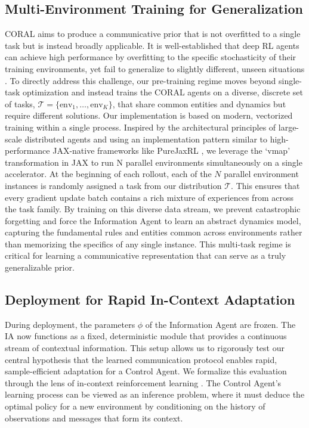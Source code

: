 \documentclass[letterpaper]{article}
\begin{document}
\subsection{Multi-Environment Training for Generalization}
CORAL aims to produce a communicative prior that is not overfitted to a single task but is instead broadly applicable. It is well-established that deep RL agents can achieve high performance by overfitting to the specific stochasticity of their training environments, yet fail to generalize to slightly different, unseen situations \cite{cobbe2020leveraging}.
To directly address this challenge, our pre-training regime moves beyond single-task optimization and instead trains the CORAL agents on a diverse, discrete set of tasks, $\mathcal{T} = \{\text{env}_1, \ldots, \text{env}_K\}$, that share common entities and dynamics but require different solutions. Our implementation is based on modern, vectorized training within a single process. Inspired by the architectural principles of large-scale distributed agents \cite{espeholt2018impala} and using an implementation pattern similar to high-performance JAX-native frameworks like PureJaxRL \cite{lu2022discovered}, we leverage the `vmap' transformation in JAX \cite{jax2018github} to run N parallel environments simultaneously on a single accelerator.
At the beginning of each rollout, each of the $N$ parallel environment instances is randomly assigned a task from our distribution $\mathcal{T}$. This ensures that every gradient update batch contains a rich mixture of experiences from across the task family. By training on this diverse data stream, we prevent catastrophic forgetting and force the Information Agent to learn an abstract dynamics model, capturing the fundamental rules and entities common across environments rather than memorizing the specifics of any single instance. This multi-task regime is critical for learning a communicative representation that can serve as a truly generalizable prior.
\subsection{Deployment for Rapid In-Context Adaptation}
During deployment, the parameters $\phi$ of the Information Agent are frozen. The IA now functions as a fixed, deterministic module that provides a continuous stream of contextual information. This setup allows us to rigorously test our central hypothesis that the learned communication protocol enables rapid, sample-efficient adaptation for a Control Agent.
We formalize this evaluation through the lens of in-context reinforcement learning \cite{lee2023supervised, laskin2023incontext}. The Control Agent's learning process can be viewed as an inference problem, where it must deduce the optimal policy for a new environment by conditioning on the history of observations and messages that form its context.
\end{document}
